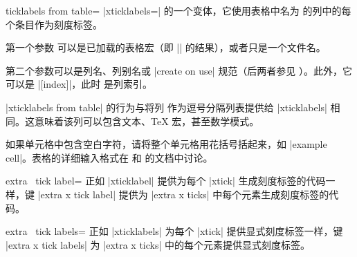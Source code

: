 \begin{pgfplotsxykey}{\x ticklabels from table=}
    |xticklabels=| 的一个变体，它使用表格中名为  的列中的每个条目作为刻度标签。

    第一个参数  可以是已加载的表格宏（即 |\pgfplotstableread| 的结果），或者只是一个文件名。

    第二个参数可以是列名、列别名或 |create on use| 规范（后两者参见 \PGFPlotstable{}）。此外，它可以是 |[index]|，此时  是列索引。

    |xticklabels from table| 的行为与将列  作为逗号分隔列表提供给 |xticklabels| 相同。这意味着该列可以包含文本、\TeX{} 宏，甚至数学模式。

    如果单元格中包含空白字符，请将整个单元格用花括号括起来，如 |{example cell}|。表格的详细输入格式在  和 \PGFPlotstable{} 的文档中讨论。
\end{pgfplotsxykey}

\begin{pgfplotsxykey}{extra \x\ tick label=}
    正如 |xticklabel| 提供为每个 |xtick| 生成刻度标签的代码一样，键 |extra x tick label| 提供为 |extra x ticks| 中每个元素生成刻度标签的代码。
\end{pgfplotsxykey}

\begin{pgfplotsxykey}{extra \x\ tick labels=}
    正如 |xticklabels| 为每个 |xtick| 提供显式刻度标签一样，键 |extra x tick labels| 为 |extra x ticks| 中的每个元素提供显式刻度标签。
\end{pgfplotsxykey}

